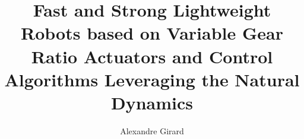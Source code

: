 % 
% 
%
%
%
%
%
%
%
% 
% 


\title{Fast and Strong Lightweight Robots based on Variable Gear Ratio Actuators and Control Algorithms Leveraging the Natural Dynamics}

\author{Alexandre Girard}


